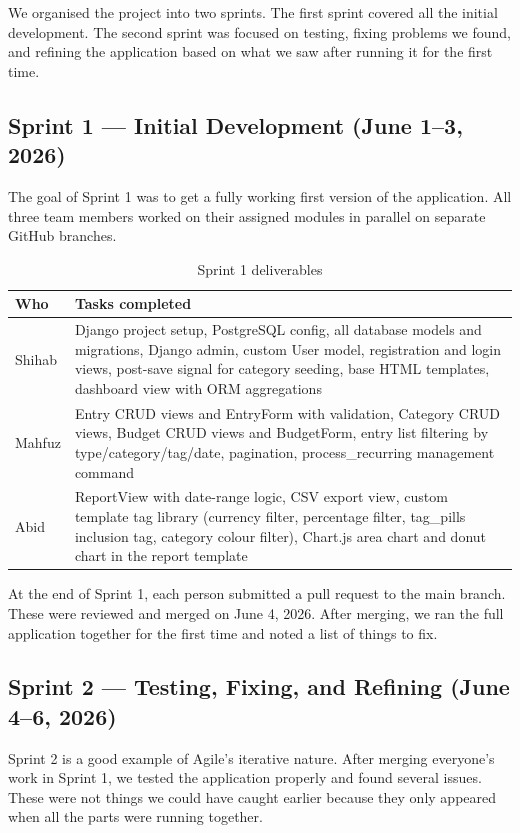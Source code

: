 \documentclass[12pt,a4paper]{report}
\begin{document}
We organised the project into two sprints. The first sprint covered all the initial development. The second sprint was focused on testing, fixing problems we found, and refining the application based on what we saw after running it for the first time.

\subsection{Sprint 1 --- Initial Development (June 1--3, 2026)}

The goal of Sprint 1 was to get a fully working first version of the application. All three team members worked on their assigned modules in parallel on separate GitHub branches.

\begin{table}[htbp]
\centering
\begin{tabular}{@{}lp{10cm}@{}}
\toprule
\textbf{Who} & \textbf{Tasks completed} \\
\midrule
Shihab & Django project setup, PostgreSQL config, all database models and migrations, Django admin, custom User model, registration and login views, post-save signal for category seeding, base HTML templates, dashboard view with ORM aggregations \\[4pt]
Mahfuz & Entry CRUD views and EntryForm with validation, Category CRUD views, Budget CRUD views and BudgetForm, entry list filtering by type/category/tag/date, pagination, process\_recurring management command \\[4pt]
Abid   & ReportView with date-range logic, CSV export view, custom template tag library (currency filter, percentage filter, tag\_pills inclusion tag, category colour filter), Chart.js area chart and donut chart in the report template \\
\bottomrule
\end{tabular}
\caption{Sprint 1 deliverables}
\end{table}

At the end of Sprint 1, each person submitted a pull request to the main branch. These were reviewed and merged on June 4, 2026. After merging, we ran the full application together for the first time and noted a list of things to fix.

\subsection{Sprint 2 --- Testing, Fixing, and Refining (June 4--6, 2026)}

Sprint 2 is a good example of Agile's iterative nature. After merging everyone's work in Sprint 1, we tested the application properly and found several issues. These were not things we could have caught earlier because they only appeared when all the parts were running together.
\end{document}

